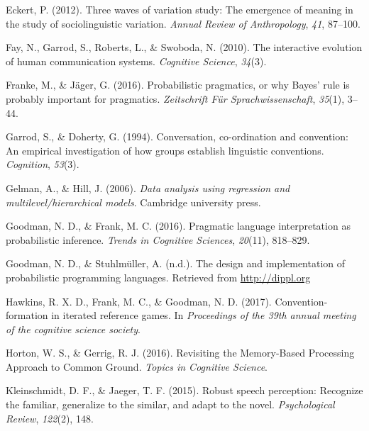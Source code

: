 \documentclass[10pt, letterpaper]{article}
\begin{document}
\leavevmode\hypertarget{ref-eckert_three_2012}{}%
Eckert, P. (2012). Three waves of variation study: The emergence of
meaning in the study of sociolinguistic variation. \emph{Annual Review
of Anthropology}, \emph{41}, 87--100.

\leavevmode\hypertarget{ref-fay_interactive_2010}{}%
Fay, N., Garrod, S., Roberts, L., \& Swoboda, N. (2010). The interactive
evolution of human communication systems. \emph{Cognitive Science},
\emph{34}(3).

\leavevmode\hypertarget{ref-FrankeJager16_ProbabilisticPragmatics}{}%
Franke, M., \& Jäger, G. (2016). Probabilistic pragmatics, or why Bayes'
rule is probably important for pragmatics. \emph{Zeitschrift Für
Sprachwissenschaft}, \emph{35}(1), 3--44.

\leavevmode\hypertarget{ref-garrod_conversation_1994}{}%
Garrod, S., \& Doherty, G. (1994). Conversation, co-ordination and
convention: An empirical investigation of how groups establish
linguistic conventions. \emph{Cognition}, \emph{53}(3).

\leavevmode\hypertarget{ref-gelman2006data}{}%
Gelman, A., \& Hill, J. (2006). \emph{Data analysis using regression and
multilevel/hierarchical models}. Cambridge university press.

\leavevmode\hypertarget{ref-GoodmanFrank16_RSATiCS}{}%
Goodman, N. D., \& Frank, M. C. (2016). Pragmatic language
interpretation as probabilistic inference. \emph{Trends in Cognitive
Sciences}, \emph{20}(11), 818--829.

\leavevmode\hypertarget{ref-GoodmanStuhlmuller14_DIPPL}{}%
Goodman, N. D., \& Stuhlmüller, A. (n.d.). The design and implementation
of probabilistic programming languages. Retrieved from
\url{http://dippl.org}

\leavevmode\hypertarget{ref-hawkins_convention-formation_2017}{}%
Hawkins, R. X. D., Frank, M. C., \& Goodman, N. D. (2017).
Convention-formation in iterated reference games. In \emph{Proceedings
of the 39th annual meeting of the cognitive science society}.

\leavevmode\hypertarget{ref-horton_revisiting_2016}{}%
Horton, W. S., \& Gerrig, R. J. (2016). Revisiting the Memory-Based
Processing Approach to Common Ground. \emph{Topics in Cognitive
Science}.

\leavevmode\hypertarget{ref-KleinschmidtJaeger15_RobustSpeechPerception}{}%
Kleinschmidt, D. F., \& Jaeger, T. F. (2015). Robust speech perception:
Recognize the familiar, generalize to the similar, and adapt to the
novel. \emph{Psychological Review}, \emph{122}(2), 148.
\end{document}
